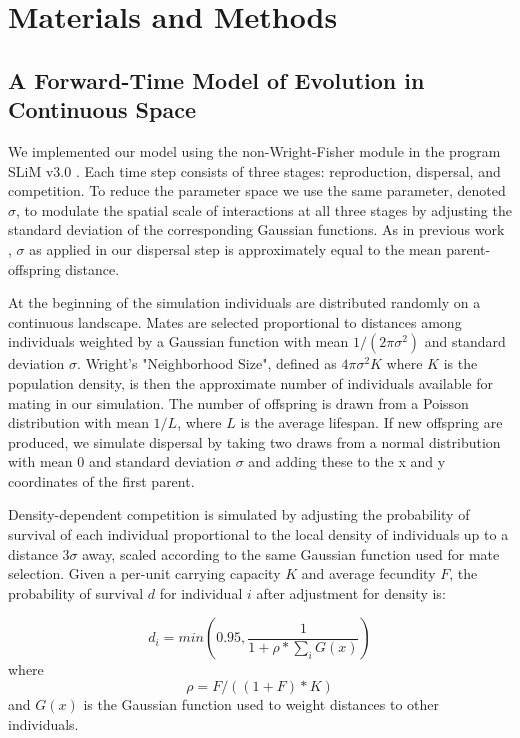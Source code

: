 \documentclass[9pt,twocolumn,twoside,lineno]{gsajnl}
\begin{document}
\section{Materials and Methods}
\label{sec:materials:methods}

\subsection{A Forward-Time Model of Evolution in Continuous Space}

We implemented our model using the non-Wright-Fisher module in the program SLiM v3.0 \citep{Haller2019}. Each time step consists of three stages: reproduction, dispersal, and competition. To reduce the parameter space we use the same parameter, denoted $\sigma$, to modulate the spatial scale of interactions at all three stages by adjusting the standard deviation of the corresponding Gaussian functions. As in previous work \citep{Wright1943,Ringbauer2017}, $\sigma$ as applied in our dispersal step is approximately equal to the mean parent-offspring distance.  

At the beginning of the simulation individuals are distributed randomly on a continuous landscape. Mates are selected proportional to distances among individuals weighted by a Gaussian function with mean $1/(2\pi\sigma^2)$ and standard deviation $\sigma$. Wright's \cite{Wright1943} "Neighborhood Size", defined as $4\pi\sigma^2 K$ where $K$ is the population density, is then the approximate number of individuals available for mating in our simulation. The number of offspring is drawn from a Poisson distribution with mean $1/L$, where $L$ is the average lifespan. If new offspring are produced, we simulate dispersal by taking two draws from a normal distribution with mean 0 and standard deviation $\sigma$ and adding these to the x and y coordinates of the first parent. 

Density-dependent competition is simulated by adjusting the probability of survival of each individual proportional to the local density of individuals up to a distance $3\sigma$ away, scaled according to the same Gaussian function used for mate selection. Given a per-unit carrying capacity $K$ and average fecundity $F$, the probability of survival $d$ for individual $i$ after adjustment for density is:

\begin{equation}
    d_{i}=min(0.95,\frac{1}{1+\rho*\sum_{i}{G(x)}})
\end{equation}
where 
\begin{equation}
    \rho = F/((1+F)*K)
\end{equation} 
and $G(x)$ is the Gaussian function used to weight distances to other individuals. 
\end{document}
